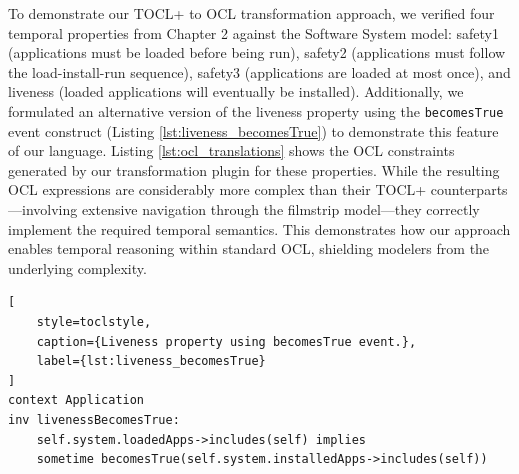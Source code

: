 To demonstrate our TOCL+ to OCL transformation approach, we verified four temporal 
properties from Chapter 2 against the Software System model: safety1 (applications 
must be loaded before being run), safety2 (applications must follow the 
load-install-run sequence), safety3 (applications are loaded at most once), and 
liveness (loaded applications will eventually be installed). Additionally, we 
formulated an alternative version of the liveness property using the 
\texttt{becomesTrue} event construct (Listing \ref{lst:liveness_becomesTrue}) to 
demonstrate this feature of our language. Listing \ref{lst:ocl_translations} shows 
the OCL constraints generated by our transformation plugin for these properties. 
While the resulting OCL expressions are considerably more complex than their TOCL+ 
counterparts—involving extensive navigation through the filmstrip model—they 
correctly implement the required temporal semantics. This demonstrates how our 
approach enables temporal reasoning within standard OCL, shielding modelers 
from the underlying complexity.

\begin{lstlisting}[
    style=toclstyle,
    caption={Liveness property using becomesTrue event.},
    label={lst:liveness_becomesTrue}
]
context Application
inv livenessBecomesTrue:
    self.system.loadedApps->includes(self) implies
    sometime becomesTrue(self.system.installedApps->includes(self))
\end{lstlisting}

